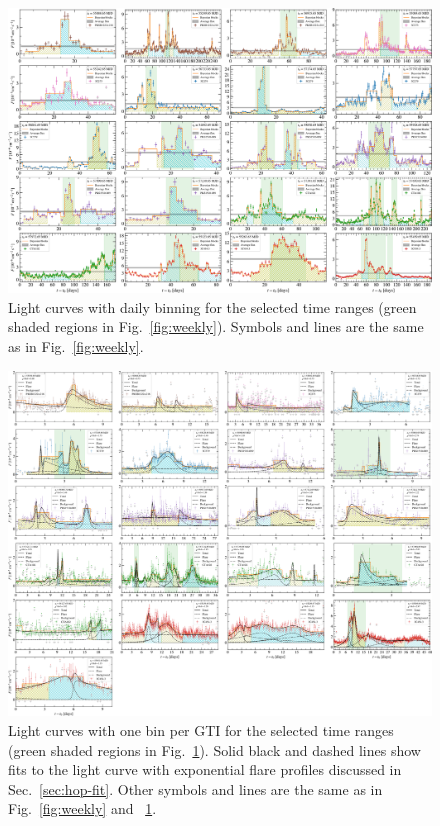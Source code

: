 \documentclass[twocolumn]{aastex62}
\begin{document}
\begin{figure}
    \centering
    \includegraphics[width = .99\linewidth]{figures/lc_daily_tsmin9.pdf}
    \caption{\label{fig:daily} Light curves with daily binning for the selected time ranges (green shaded regions in Fig.~\ref{fig:weekly}). Symbols and lines are the same as in Fig.~\ref{fig:weekly}.}
\end{figure}


\begin{figure}
    \centering
    \includegraphics[width = .99\linewidth]{figures/lcfithop_orbit_all_maxiter2_fsys0p00_addcomp0_comb.pdf}
    \caption{ Light curves with one bin per GTI for the selected time ranges (green shaded regions in Fig.~\ref{fig:daily}). Solid black and dashed lines show fits to the light curve with exponential flare profiles discussed in Sec.~\ref{sec:hop-fit}. Other symbols and lines are the same as in Fig.~\ref{fig:weekly} and ~\ref{fig:daily}.}
    \label{fig:gti}
\end{figure}
\end{document}
